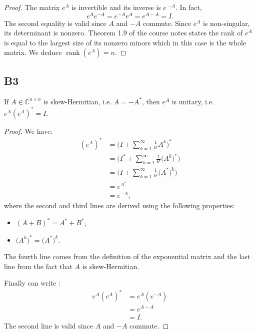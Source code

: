\documentclass[11pt]{article}
\DeclareMathOperator{\rank}{rank}
\newcommand{\complex}{\mathbb{C}} %
\begin{document}
\begin{proof}
The matrix $e^A$ is invertible and its inverse is $e^{—A}$.
In fact,
\[
    e^{A}e^{-A}=e^{-A}e^{A}=e^{A-A}=I.
\]
The second equality is valid since \(A\) and \(-A\) commute. Since $e^{A}$ is non-singular, its determinant is nonzero. Theorem 1.9 of the course notes states the rank of $e^A$ is equal to the largest size of its nonzero minors which in this case is the whole matrix. We deduce $\rank(e^A)=n$. 
\end{proof}

\subsection*{B3}
If \(A \in \complex^{n \times n}\) is skew-Hermitian, i.e. $A=-A^*$, then $e^A$ is unitary, i.e. $e^A(e^A)^*=I$.
\begin{proof}
We have:
\begin{align*}
    (e^A)^*&=\Bigg(I+\sum^{\infty}_{k=1}\frac{1}{k!}A^k\Bigg)^{*}\\
    &=\Bigg(I^{*}+\sum^{\infty}_{k=1}\frac{1}{k!}\big(A^k\big)^{*}\Bigg)\\
    &=\Bigg(I+\sum^{\infty}_{k=1}\frac{1}{k!}\big(A^{*}\big)^k\Bigg)\\
    &=e^{A^{*}}\\
    &=e^{-A},
\end{align*}
where the second and third lines are derived using the following properties:
\begin{itemize}
    \item $(A+B)^{*}=A^{*}+B^{*}$;
    \item $\big(A^k\big)^*=\big(A^*\big)^k$.
\end{itemize}
The fourth line comes from the definition of the exponential matrix and the last line from the fact that \(A\) is skew-Hermitian.

Finally can write :
\begin{align*}
    e^A(e^A)^*&=e^A(e^{-A})\\
    &=e^{A-A}\\
    &=I.
\end{align*}
The second line is valid since \(A\) and \(-A\) commute.
\end{proof}
\end{document}
